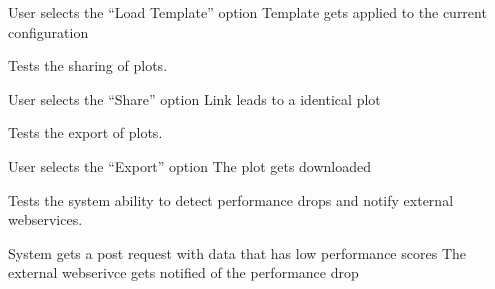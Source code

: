 {User selects the \enquote{Load Template} option}
{Template gets applied to the current configuration}


Tests the sharing of \glspl{plot}.

{User selects the \enquote{Share} option}
{Link leads to a identical \gls{plot}}


Tests the export of \glspl{plot}.

{User selects the \enquote{Export} option}
{The \gls{plot} gets downloaded}


Tests the system ability to detect performance drops and notify external webservices.

{System gets a post request with data that has low performance scores}
{The external webserivce gets notified of the performance drop}
